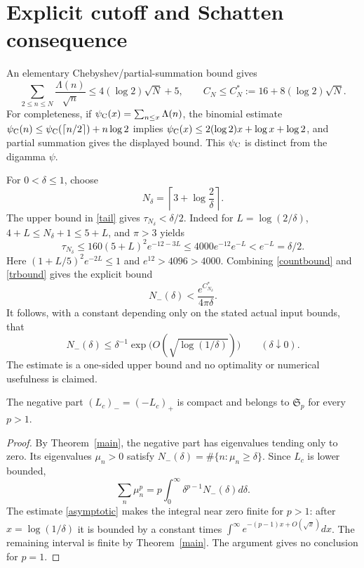 \documentclass[11pt]{article}
\begin{document}
\section{Explicit cutoff and Schatten consequence}\label{rate}
An elementary Chebyshev/partial-summation bound gives \cite{collarnote}
\[\sum_{2\le n\le N}\frac{\Lambda(n)}{\sqrt n}\le4(\log2)\sqrt N+5,\qquad C_N\le C_N^*:=16+8(\log2)\sqrt N.
\]
For completeness, if $\psi_{\rm C}(x)=\sum_{n\le x}\Lambda(n)$, the binomial estimate $\psi_{\rm C}(n)\le\psi_{\rm C}(\lceil n/2\rceil)+n\log2$ implies $\psi_{\rm C}(x)\le2(\log2)x+\log x+\log2$, and partial summation gives the displayed bound. This $\psi_{\rm C}$ is distinct from the digamma $\psi$.

For $0<\delta\le1$, choose
\begin{equation}\label{Ndelta}
 N_\delta=\left\lceil3+\log\frac2\delta\right\rceil.
\end{equation}
The upper bound in \eqref{tail} gives $\tau_{N_\delta}<\delta/2$. Indeed for $L=\log(2/\delta)$, $4+L\le N_\delta+1\le5+L$, and $\pi>3$ yields
\[\tau_{N_\delta}\le160(5+L)^2e^{-12-3L}\le4000e^{-12}e^{-L}<e^{-L}=\delta/2.
\]
Here $(1+L/5)^2e^{-2L}\le1$ and $e^{12}>4096>4000$. Combining \eqref{countbound} and \eqref{trbound} gives the explicit bound
\begin{equation}\label{explicit}
 N_-(\delta)< \frac{e^{C^*_{N_\delta}}}{4\pi\delta}.
\end{equation}
It follows, with a constant depending only on the stated actual input bounds, that
\begin{equation}\label{asymptotic}
 N_-(\delta)\le\delta^{-1}\exp\!\bigl(O(\sqrt{\log(1/\delta)})\bigr)\qquad(\delta\downarrow0).
\end{equation}
The estimate is a one-sided upper bound and no optimality or numerical usefulness is claimed.

\begin{corollary}\label{schatten}
The negative part $(L_c)_-=(-L_c)_+$ is compact and belongs to $\mathfrak S_p$ for every $p>1$.
\end{corollary}
\begin{proof}
By Theorem~\ref{main}, the negative part has eigenvalues tending only to zero. Its eigenvalues $\mu_n>0$ satisfy $N_-(\delta)=\#\{n:\mu_n\ge\delta\}$. Since $L_c$ is lower bounded,
\[\sum_n\mu_n^p=p\int_0^\infty \delta^{p-1}N_-(\delta)d\delta.
\]
The estimate \eqref{asymptotic} makes the integral near zero finite for $p>1$: after $x=\log(1/\delta)$ it is bounded by a constant times $\int^\infty e^{-(p-1)x+O(\sqrt x)}dx$. The remaining interval is finite by Theorem~\ref{main}. The argument gives no conclusion for $p=1$.
\end{proof}
\end{document}
